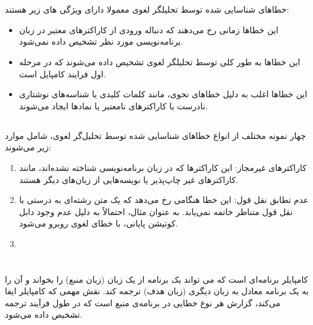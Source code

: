\documentclass{article}
\begin{document}
\section{}
\subsection{}
خطاهای شناسایی شده توسط تحلیلگر لغوی معمولا دارای ویژگی های زیر هستند:
\begin{itemize}
\item این خطاها زمانی رخ می‌دهند که دنباله ورودی از کاراکترهای معتبر در زبان برنامه‌نویسی مورد نظر تشخیص داده نمی‌شود.
\item این خطاها به طور کلی توسط تحلیلگر لغوی تشخیص داده می‌شوند که در مرحله اول فرایند کامپایل است.
\item این خطاها اغلب به دلیل خطاهای نحوی، مانند کلمات کلیدی یا شناسه‌های نوشتاری نادرست یا کاراکترهای نامعتبر یا نمادها ایجاد می‌شوند.
\end{itemize}

\subsection{}
چهار نمونه مختلف از انواع خطاهای شناسایی شده توسط تحلیل‌گر لغوی، شامل موارد زیر می‌شوند:

\begin{enumerate}
\item کاراکترهای غیرمجاز: این کاراکترها که در زبان برنامه‌نویسی شناخته نشده‌اند، مانند کاراکترهای غیر چاپ‌پذیر یا نویسه‌هایی از زبان‌های دیگر هستند.
\item عدم تطابق نقل قول: این خطا هنگامی رخ می‌دهد که یک متن رشته‌ای به درستی با نقل قول متناظر خاتمه نمی‌یابد. به عنوان مثال،  احتمالاً به دلیل عدم وجود دابل کوتیشن پایانی، با خطای لغوی روبرو می‌شود.
\item
\end{enumerate}

\section{}%

کامپایلر برنامه‌ای است که می تواند یک برنامه از یک زبان (زبان منبع) را بخواند و آن را به یک برنامه معادل به زبان دیگری (زبان هدف) ترجمه کند. نقش مهمی که کامپایلر ایفا می‌کند، گزارش هر نوع خطایی در برنامه‌ی منبع است که در طول فرآیند ترجمه تشخیص داده می‌شود.
\end{document}
